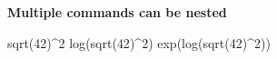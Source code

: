 \documentclass[
]{book}
\newenvironment{Shaded}{\begin{snugshade}}{\end{snugshade}}
\newcommand{\DecValTok}[1]{\textcolor[rgb]{0.00,0.00,0.81}{#1}}
\newcommand{\FunctionTok}[1]{\textcolor[rgb]{0.00,0.00,0.00}{#1}}
\newcommand{\NormalTok}[1]{#1}
\newcommand{\SpecialCharTok}[1]{\textcolor[rgb]{0.00,0.00,0.00}{#1}}
\begin{document}
\textbf{Multiple commands can be nested}

\begin{Shaded}
\begin{Highlighting}[]
\FunctionTok{sqrt}\NormalTok{(}\DecValTok{42}\NormalTok{)}\SpecialCharTok{\^{}}\DecValTok{2}
\FunctionTok{log}\NormalTok{(}\FunctionTok{sqrt}\NormalTok{(}\DecValTok{42}\NormalTok{)}\SpecialCharTok{\^{}}\DecValTok{2}\NormalTok{)}
\FunctionTok{exp}\NormalTok{(}\FunctionTok{log}\NormalTok{(}\FunctionTok{sqrt}\NormalTok{(}\DecValTok{42}\NormalTok{)}\SpecialCharTok{\^{}}\DecValTok{2}\NormalTok{))}
\end{Highlighting}
\end{Shaded}


  
\end{document}
